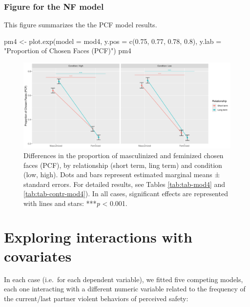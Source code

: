 \documentclass[
  bookmarksnumbered]{article}
\newenvironment{Shaded}{\begin{snugshade}}{\end{snugshade}}
\newcommand{\AttributeTok}[1]{\textcolor[rgb]{0.80,0.80,0.80}{#1}}
\newcommand{\FloatTok}[1]{\textcolor[rgb]{0.75,0.75,0.82}{#1}}
\newcommand{\FunctionTok}[1]{\textcolor[rgb]{0.94,0.94,0.56}{#1}}
\newcommand{\NormalTok}[1]{\textcolor[rgb]{0.80,0.80,0.80}{#1}}
\newcommand{\OtherTok}[1]{\textcolor[rgb]{0.94,0.94,0.56}{#1}}
\newcommand{\StringTok}[1]{\textcolor[rgb]{0.80,0.58,0.58}{#1}}
\begin{document}
\subsubsection{Figure for the NF model}\label{figure-for-the-nf-model-1}

This figure summarizes the the PCF model results.

\begin{Shaded}
\begin{Highlighting}[]
\NormalTok{pm4 }\OtherTok{\textless{}{-}} \FunctionTok{plot.exp}\NormalTok{(}\AttributeTok{model =}\NormalTok{ mod4, }
                \AttributeTok{y.pos =} \FunctionTok{c}\NormalTok{(}\FloatTok{0.75}\NormalTok{, }\FloatTok{0.77}\NormalTok{, }\FloatTok{0.78}\NormalTok{, }\FloatTok{0.8}\NormalTok{),}
                \AttributeTok{y.lab =} \StringTok{"Proportion of Chosen Faces (PCF)"}\NormalTok{)}
\NormalTok{pm4}
\end{Highlighting}
\end{Shaded}

\begin{figure}
\centering
\includegraphics{Supplementary_material_files/figure-latex/fig-mod4-1.pdf}
\caption{\label{fig:fig-mod4}Differences in the proportion of masculinized and feminized chosen faces (PCF), by relationship (short term, ling term) and condition (low, high). Dots and bars represent estimated marginal means ± standard errors. For detailed results, see Tables \ref{tab:tab-mod4} and \ref{tab:tab-contr-mod4}). In all cases, significant effects are represented with lines and stars: ***\emph{p} \textless{} 0.001.}
\end{figure}

\section{Exploring interactions with covariates}\label{exploring-interactions-with-covariates}

In each case (i.e.~for each dependent variable), we fitted five competing models, each one interacting with a different numeric variable related to the frequency of the current/last partner violent behaviors of perceived safety:
\end{document}

